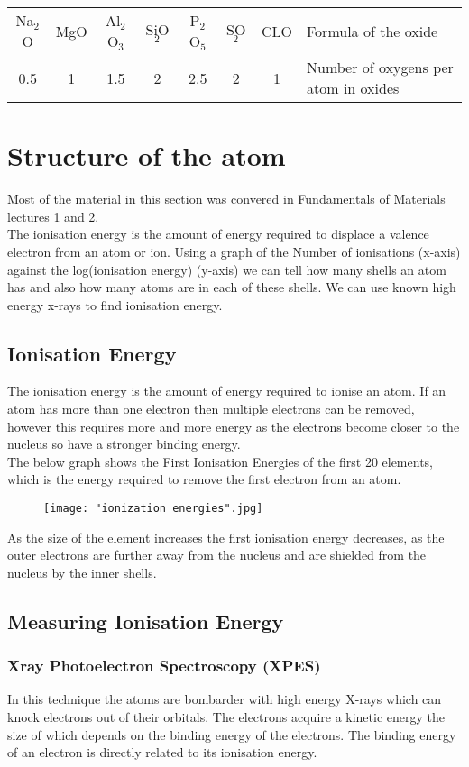 \documentclass[a4paper, 12pt]{article}
\begin{document}
	\begin{tabularx}{\textwidth}{c c c c c c c X}
		Na$_2$O & MgO & Al$_2$O$_3$ & SiO$_2$ & P$_2$O$_5$ & SO$_2$ & CLO & Formula of the oxide \\
		0.5 & 1 & 1.5 & 2 & 2.5 & 2 & 1 & Number of oxygens per atom in oxides \\
	\end{tabularx}

\section{Structure of the atom}
	Most of the material in this section was convered in Fundamentals of Materials lectures 1 and 2. \\
	The ionisation energy is the amount of energy required to displace a valence electron from an atom or ion. Using a graph of the Number of ionisations (x-axis) against the log(ionisation energy) (y-axis) we can tell how many shells an atom has and also how many atoms are in each of these shells. We can use known high energy x-rays to find ionisation energy. \\
	
	\subsection{Ionisation Energy}
		The ionisation energy is the amount of energy required to ionise an atom. If an atom has more than one electron then multiple electrons can be removed, however this requires more and more energy as the electrons become closer to the nucleus so have a stronger binding energy. \\
		The below graph shows the First Ionisation Energies of the first 20 elements, which is the energy required to remove the first electron from an atom.
		
		\begin{figure}[!ht]
			\texttt{[image: "ionization energies".jpg]}
		\end{figure}

		As the size of the element increases the first ionisation energy decreases, as the outer electrons are further away from the nucleus and are shielded from the nucleus by the inner shells.
		
	\subsection{Measuring Ionisation Energy}
		\subsubsection{Xray Photoelectron Spectroscopy (XPES)}
			In this technique the atoms are bombarder with high energy X-rays which can knock electrons out of their orbitals. The electrons acquire a kinetic energy the size of which depends on the binding energy of the electrons. The binding energy of an electron is directly related to its ionisation energy.
			
\end{document}
